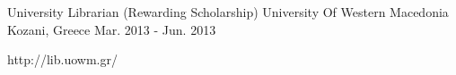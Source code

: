 \begin{cventries}

\cventry
{University Librarian (Rewarding Scholarship)} %
{University Of Western Macedonia} %
{Kozani, Greece} %
{Mar. 2013 - Jun. 2013} %
{ %
\begin{cvitems}
\item {http://lib.uowm.gr/}
\end{cvitems}
}


\end{cventries}
